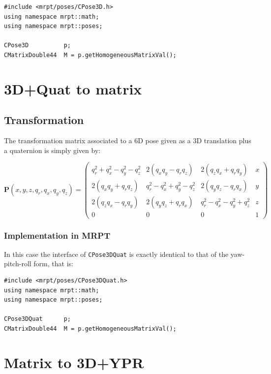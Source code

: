 \documentclass[a4paper,11pt]{report}
\begin{document}
\begin{lstlisting}
#include <mrpt/poses/CPose3D.h>
using namespace mrpt::math;
using namespace mrpt::poses;

CPose3D          p;
CMatrixDouble44  M = p.getHomogeneousMatrixVal();
\end{lstlisting}


\section{3D+Quat to matrix }
\label{sect:quat2mat}

\subsection{Transformation}

The transformation matrix associated to a 6D pose given as a 3D translation plus
a quaternion is simply given by:

\begin{equation}
\mathbf{P}(x,y,z,q_r,q_x,q_y,q_z)=\left(
  \begin{array}{ccc|c}
   q_r^2+q_x^2-q_y^2-q_z^2 	&  2(q_x q_y - q_r q_z)	&  	2(q_z q_x+q_r q_y)  & x \\
   2(q_x q_y+q_r q_z) 		& q_r^2-q_x^2+q_y^2-q_z^2 	& 2(q_y q_z-q_r q_x) 	& y \\
   2(q_z q_x-q_r q_y) & 2(q_y q_z+q_r q_x)  & q_r^2- q_x^2 - q_y^2 + q_z^2 & z \\ \hline
   0 & 0 & 0& 1
  \end{array}
\right)
\end{equation}



\subsubsection{Implementation in MRPT}

In this case the interface of \texttt{CPose3DQuat} is exactly identical to that
of the yaw-pitch-roll form, that is:

\begin{lstlisting}
#include <mrpt/poses/CPose3DQuat.h>
using namespace mrpt::math;
using namespace mrpt::poses;

CPose3DQuat      p;
CMatrixDouble44  M = p.getHomogeneousMatrixVal();
\end{lstlisting}




\section{Matrix to 3D+YPR   }
\label{sect:mat2ypr}
\end{document}
